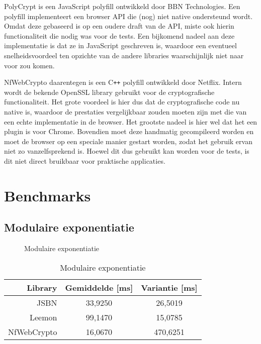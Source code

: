 \npar PolyCrypt is een JavaScript polyfill ontwikkeld door BBN Technologies.\cite{site:polycrypt} Een polyfill implementeert een browser API die (nog) niet native ondersteund wordt. Omdat deze gebaseerd is op een oudere draft van de API, miste ook hierin functionaliteit die nodig was voor de tests. Een bijkomend nadeel aan deze implementatie is dat ze in JavaScript geschreven is, waardoor een eventueel snelheidsvoordeel ten opzichte van de andere libraries waarschijnlijk niet naar voor zou komen.

\npar NfWebCrypto daarentegen is een C\texttt{++} polyfill ontwikkeld door Netflix.\cite{site:nfwebcrypto} Intern wordt de bekende OpenSSL library gebruikt voor de cryptografische functionaliteit. Het grote voordeel is hier dus dat de cryptografische code nu native is, waardoor de prestaties vergelijkbaar zouden moeten zijn met die van een echte implementatie in de browser. Het grootste nadeel is hier wel dat het een plugin is voor Chrome. Bovendien moet deze handmatig gecompileerd worden en moet de browser op een speciale manier gestart worden, zodat het gebruik ervan niet zo vanzelfsprekend is. Hoewel dit dus gebruikt kan worden voor de tests, is dit niet direct bruikbaar voor praktische applicaties.

\section{Benchmarks}
\label{sec:wc:benchmarks}

\subsection{Modulaire exponentiatie}

\begin{figure}
  \caption{Modulaire exponentiatie}
  \label{fig:wc:modular_exponentiation}
\end{figure}

\begin{table}
  \begin{center}
    \begin{tabular}{r | c c}
      Library & Gemiddelde [ms] & Variantie [ms] \\ \hline
      JSBN & 33,9250 & 26,5019  \\
      Leemon & 99,1470 & 15,0785 \\
      NfWebCrypto & 16,0670 & 470,6251
    \end{tabular}
    \caption{Modulaire exponentiatie}
    \label{tab:wc:modular_exponentiation}
  \end{center}
\end{table}

